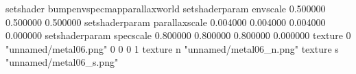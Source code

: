 setshader bumpenvspecmapparallaxworld
setshaderparam envscale 0.500000 0.500000 0.500000
setshaderparam parallaxscale 0.004000 0.004000 0.004000 0.000000
setshaderparam specscale 0.800000 0.800000 0.800000 0.000000
texture 0 "unnamed/metal06.png" 0 0 0 1
texture n "unnamed/metal06_n.png"
texture s "unnamed/metal06_s.png"